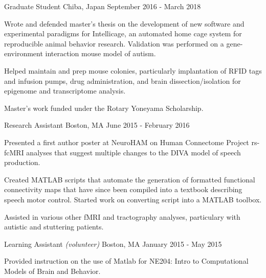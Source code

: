 \begin{cventries}
    {Graduate Student}
    {Chiba, Japan}
    {September 2016 - March 2018}
    {\begin{cvitems}
        \item{Wrote and defended master's thesis on the development of new software and
            experimental paradigms for Intellicage, an automated home cage system for
            reproducible animal behavior research. Validation was performed on a
            gene-environment interaction mouse model of autism.\vspace*{0.1cm}}
        \item{Helped maintain and prep mouse colonies, particularly implantation of RFID
            tags and infusion pumps, drug administration, and brain dissection/isolation
            for epigenome and transcriptome analysis.\vspace*{0.1cm}}
        \item{Master's work funded under the Rotary Yoneyama Scholarship.}
    \end{cvitems}}
    \vspace*{0.2cm}
    
    {Research Assistant}
    {Boston, MA}
    {June 2015 - February 2016}
    {\begin{cvitems}
        \item{Presented a first author poster at NeuroHAM on Human Connectome Project
            rs-fcMRI analyses that suggest multiple changes to the DIVA model of speech
            production.\vspace*{0.1cm}}
        \item{Created MATLAB scripts that automate the generation of formatted functional
            connectivity maps that have since been compiled into a textbook describing
            speech motor control. Started work on converting script into a MATLAB
            toolbox.\vspace*{0.1cm}}
        \item{Assisted in various other fMRI and tractography analyses, particulary
            with autistic and stuttering patients.}
    \end{cvitems}}
    \vspace*{0.2cm}
    
    {Learning Assistant \textnormal{\small{\textit{(volunteer)}}}}
    {Boston, MA}
    {January 2015 - May 2015}
    {\begin{cvitems}
        \item{Provided instruction on the use of Matlab for NE204: Intro to Computational
            Models of Brain and Behavior.}
    \end{cvitems}}
    \vspace*{0.2cm}
    

\end{cventries}
